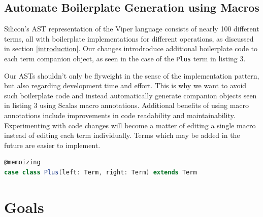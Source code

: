 \documentclass[11pt]{article}
\begin{document}
    \subsection{Automate Boilerplate Generation using Macros} \label{approach:macros}

    Silicon's AST representation of the Viper language consists of nearly 100 different terms,
    all with boilerplate implementations for different operations, as discussed in section \ref{introduction}.
    Our changes introdroduce additional boilerplate code to each term companion object, as seen in the case
    of the \texttt{Plus} term in listing 3.

    Our ASTs shouldn't only be flyweight in the sense of the implementation pattern, but also
    regarding development time and effort. This is why we want to avoid such boilerplate
    code and instead automatically generate companion objects seen in listing 3 using Scalas macro annotations.
    Additional benefits of using macro annotations include improvements in code
    readability and maintainability. Experimenting with code changes will become a matter
    of editing a single macro instead of editing each term individually.
    Terms which may be added in the future are easier to implement.

    \begin{lstlisting}[language=Scala, caption=One possible way to use macro annotations to automatically generate code in listing 3.]
@memoizing
case class Plus(left: Term, right: Term) extends Term
        \end{lstlisting}

    \section{Goals}
\end{document}

